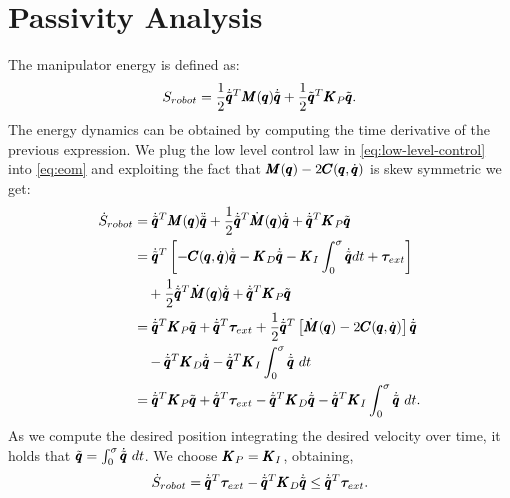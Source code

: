 \section{Passivity Analysis}\label{app:passivity_analysis}
The manipulator energy is defined as:
\begin{equation}
    S_{robot} = \frac{1}{2} \dot{\tilde{\pmb{q}}}^T \pmb{M}(\pmb{q}) \dot{\tilde{\pmb{q}}} + \frac{1}{2} \tilde{\pmb{q}}^T \pmb{K}_P \tilde{\pmb{q}}.
\end{equation}
The energy dynamics can be obtained by computing the time derivative of the previous expression. We plug the low level control law in \eqref{eq:low-level-control} into \eqref{eq:eom} and exploiting the fact that $\pmb{M}(\pmb{q}) - 2 \pmb{C}(\pmb{q}, \dot{\pmb{q}})$ is skew symmetric we get:
\begin{equation}
\begin{aligned}
    \dot{S}_{robot} &= \dconfigRobotError^T \massMatrix \ddconfigRobotError + \frac{1}{2} \dconfigRobotError^T \dot{\matr{M}}(\configRobot) \dconfigRobotError + \dconfigRobotError^T \matr{K}_P \configRobotError \\
    &= \dconfigRobotError^T \left[ -\coriolis \dconfigRobotError -  \matr{K}_D \dconfigRobotError - \matr{K}_I \int_{0}^{\sigma} \dconfigRobotError dt + \externalTorque \right] \\
    &\quad + \frac{1}{2} \dconfigRobotError^T \dot{\matr{M}}(\configRobot) \dconfigRobotError + \dconfigRobotError^T \matr{K}_P \configRobotError \\
    &= \dconfigRobotError^T \matr{K}_P \configRobotError + \dconfigRobotError^T \externalTorque + \frac{1}{2} \dconfigRobotError^T\left[ \dot{\matr{M}}(\configRobot) - 2\coriolis \right] \dconfigRobotError \\
    &\quad - \dconfigRobotError^T \matr{K}_D \dconfigRobotError  - \dconfigRobotError^T \matr{K}_I \int^{\sigma}_{0} \dconfigRobotError\ dt\\
    &= \dconfigRobotError^T \matr{K}_P \configRobotError + \dconfigRobotError^T \externalTorque - \dconfigRobotError^T \matr{K}_D \dconfigRobotError -  \dconfigRobotError^T \matr{K}_I \int^{\sigma}_{0} \dconfigRobotError\ dt.  
\end{aligned}
\end{equation}
As we compute the desired position integrating the desired velocity over time, it holds that $\tilde{\pmb{q}} = \int^{\sigma}_{0}
\dot{\tilde{\pmb{q}}}\ dt$. We choose $\pmb{K}_P = \pmb{K}_I$, obtaining,
\begin{equation}
    \dot{S}_{robot} = \dot{\tilde{\pmb{q}}}^T \boldsymbol{\tau}_{ext} - \dot{\tilde{\pmb{q}}}^T \pmb{K}_D \dot{\tilde{\pmb{q}}} \leq \dot{\tilde{\pmb{q}}}^T \boldsymbol{\tau}_{ext}. 
\end{equation}

